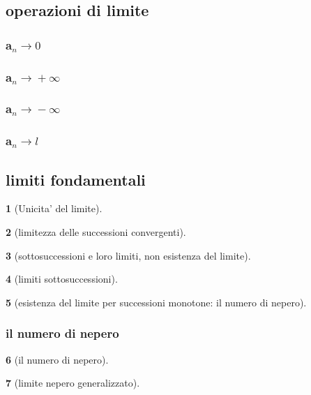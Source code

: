 \documentclass{article}
\theoremstyle{mystyle}
\newtheorem*{mydefinition}{}
\begin{document}
\subsection{operazioni di limite}

\subsubsection{a$_n \xrightarrow{} 0$}
\subsubsection{a$_n \xrightarrow{} +\infty$}
\subsubsection{a$_n \xrightarrow{} -\infty$}
\subsubsection{a$_n \xrightarrow{} l$}
\subsection{limiti fondamentali}
\begin{mydefinition}[Unicita' del limite]
    
\end{mydefinition}
\begin{mydefinition}[limitezza delle successioni convergenti]
    
\end{mydefinition}

\begin{mydefinition}[sottosuccessioni e loro limiti, non esistenza del limite]
    
\end{mydefinition}
\begin{mydefinition}[limiti sottosuccessioni]
    
\end{mydefinition}
\begin{mydefinition}[esistenza del limite per successioni monotone: il numero di nepero]
    
\end{mydefinition}
\subsubsection{il numero di nepero}
\begin{mydefinition}[il numero di nepero]
    
\end{mydefinition}
\begin{mydefinition}[limite nepero generalizzato]
    
\end{mydefinition}
\end{document}
